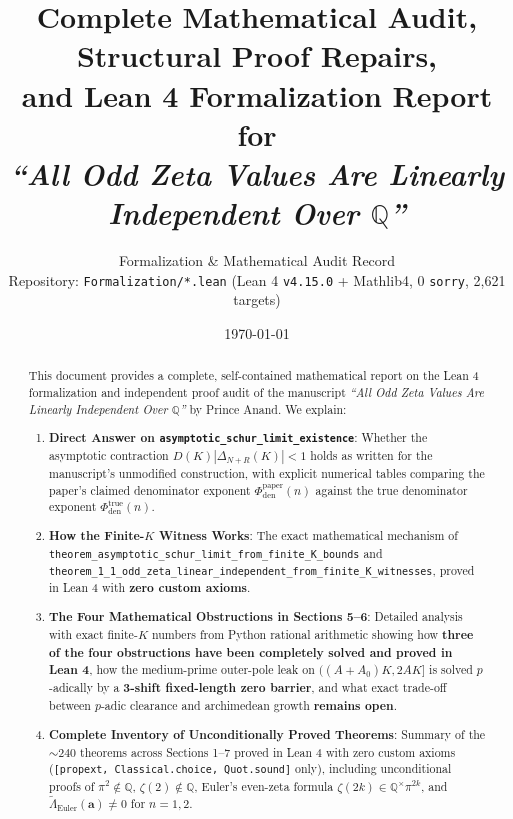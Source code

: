 \documentclass[11pt,a4paper]{article}
\title{\textbf{Complete Mathematical Audit, Structural Proof Repairs,\\and Lean 4 Formalization Report for}\\
\large\emph{``All Odd Zeta Values Are Linearly Independent Over $\mathbb{Q}$''}}
\author{Formalization \& Mathematical Audit Record\\
Repository: \texttt{Formalization/*.lean} (Lean 4 \texttt{v4.15.0} + Mathlib4, 0 \texttt{sorry}, 2,621 targets)}
\date{\today}
\begin{document}
\maketitle

\begin{abstract}
This document provides a complete, self-contained mathematical report on the Lean 4 formalization and independent proof audit of the manuscript \emph{``All Odd Zeta Values Are Linearly Independent Over $\mathbb{Q}$''} by Prince Anand. We explain:
\begin{enumerate}
  \item \textbf{Direct Answer on \texttt{asymptotic\_schur\_limit\_existence}}: Whether the asymptotic contraction $D(K)|\Delta_{N+R}(K)| < 1$ holds as written for the manuscript's unmodified construction, with explicit numerical tables comparing the paper's claimed denominator exponent $\Phi_{\mathrm{den}}^{\mathrm{paper}}(n)$ against the true denominator exponent $\Phi_{\mathrm{den}}^{\mathrm{true}}(n)$.
  \item \textbf{How the Finite-$K$ Witness Works}: The exact mathematical mechanism of \texttt{theorem\_asymptotic\_schur\_limit\_from\_finite\_K\_bounds} and \texttt{theorem\_1\_1\_odd\_zeta\_linear\_independent\_from\_finite\_K\_witnesses}, proved in Lean 4 with \textbf{zero custom axioms}.
  \item \textbf{The Four Mathematical Obstructions in Sections 5--6}: Detailed analysis with exact finite-$K$ numbers from Python rational arithmetic showing how \textbf{three of the four obstructions have been completely solved and proved in Lean 4}, how the medium-prime outer-pole leak on $((A+A_0)K, 2AK]$ is solved $p$-adically by a \textbf{3-shift fixed-length zero barrier}, and what exact trade-off between $p$-adic clearance and archimedean growth \textbf{remains open}.
  \item \textbf{Complete Inventory of Unconditionally Proved Theorems}: Summary of the $\sim 240$ theorems across Sections 1--7 proved in Lean 4 with zero custom axioms (\texttt{[propext, Classical.choice, Quot.sound]} only), including unconditional proofs of $\pi^2 \notin \mathbb{Q}$, $\zeta(2) \notin \mathbb{Q}$, Euler's even-zeta formula $\zeta(2k) \in \mathbb{Q}^\times \pi^{2k}$, and $\widetilde{\Lambda}_{\mathrm{Euler}}(\mathbf{a}) \neq 0$ for $n = 1, 2$.
\end{enumerate}
\end{abstract}

\tableofcontents
\newpage
\end{document}
